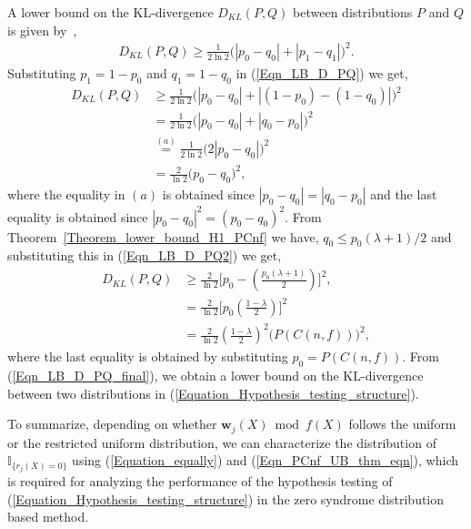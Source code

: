 \documentclass[10pt,journal]{IEEEtran}
\begin{document}
% 
A lower bound on the KL-divergence $D_{KL}(P,Q)$ between distributions $P$ and $Q$ is given by~\cite[Sec.~11.6]{ThomasCover2006},
% 
\begin{align}
%  
D_{KL}(P,Q) \geq \frac{1}{2 \ln 2} \Big( |p_0-q_0| + |p_1-q_1| \Big)^2.
\label{Eqn_LB_D_PQ}
% 
\end{align}
% 
Substituting $p_1=1-p_0$ and $q_1=1-q_0$ in (\ref{Eqn_LB_D_PQ}) we get,
% 
\begin{align}
%  
D_{KL}(P,Q) &\geq \frac{1}{2 \ln 2} \Big( |p_0-q_0| + |(1-p_0)-(1-q_0)| \Big)^2  \\
	    &= \frac{1}{2 \ln 2} \Big( |p_0-q_0| + |q_0-p_0| \Big)^2  \\
	    &\stackrel{(a)}{=} \frac{1}{2 \ln 2} \Big( 2|p_0-q_0| \Big)^2 \\
	    &= \frac{2}{\ln 2} \big(p_0-q_0\big)^2, 	    
\label{Eqn_LB_D_PQ2}
% 
\end{align}
% 
where the equality in $(a)$ is obtained since $|p_0-q_0| = |q_0-p_0|$ and the last equality
is obtained since $|p_0-q_0|^2 = (p_0-q_0)^2$.
% 
From Theorem~\ref{Theorem_lower_bound_H1_PCnf} we have, $q_0 \leq p_0 (\lambda + 1)/2$ 
and substituting this in (\ref{Eqn_LB_D_PQ2}) we get,
% 
% 
\begin{align}
%  
D_{KL}(P,Q) &\geq \frac{2}{\ln 2} \bigg[p_0 - \left(\frac{p_0 (\lambda+1) }{2} \right)  \bigg]^2,\\
	    &= \frac{2}{\ln 2} \bigg[p_0 \left(\frac{ 1-\lambda }{2} \right)  \bigg]^2\\
	    &= \frac{2}{\ln 2} \left(\frac{ 1-\lambda }{2} \right)^2 \Big( P(C(n,f)) \Big)^2,	    
\label{Eqn_LB_D_PQ_final}
% 
\end{align}
% 
where the last equality is obtained by substituting $p_0 = P(C(n,f))$.
From (\ref{Eqn_LB_D_PQ_final}), we obtain
a lower bound on the KL-divergence between two distributions in (\ref{Equation_Hypothesis_testing_structure}).

To summarize, depending on whether $\mathbf{w}_j(X) \bmod f(X)$ follows the uniform or the restricted uniform distribution, 
we can characterize the distribution of $\mathbb{I}_{\{{r}_j(X)=0\}}$ using (\ref{Equation_equally}) and (\ref{Eqn_PCnf_UB_thm_eqn}),
which is required for analyzing the performance of the hypothesis testing of (\ref{Equation_Hypothesis_testing_structure}) in 
the zero syndrome distribution based method.


\end{document}
